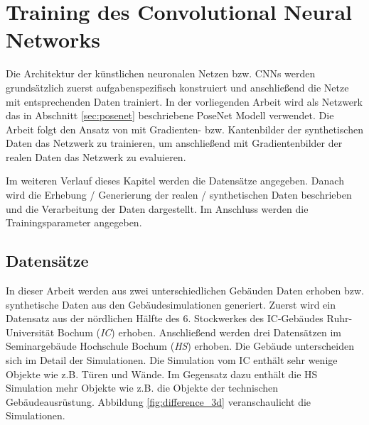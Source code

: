 
\section{Training des Convolutional Neural Networks}
Die Architektur der künstlichen neuronalen Netzen bzw. CNNs werden grundsätzlich zuerst aufgabenspezifisch konstruiert und anschließend die Netze mit entsprechenden Daten trainiert. In der vorliegenden Arbeit wird als Netzwerk das in Abschnitt \ref{sec:posenet} beschriebene PoseNet Modell verwendet. Die Arbeit folgt den Ansatz von \citet{acharyaBIMPoseNetIndoorCamera2019} mit Gradienten- bzw. Kantenbilder der synthetischen Daten das Netzwerk zu trainieren, um anschließend mit Gradientenbilder der realen Daten das Netzwerk zu evaluieren. 


Im weiteren Verlauf dieses Kapitel werden die Datensätze angegeben. Danach wird die Erhebung / Generierung der realen / synthetischen Daten beschrieben und die Verarbeitung der Daten dargestellt. Im Anschluss werden die Trainingsparameter angegeben. 

\subsection{Datensätze}
\label{subsec:datasets}
In dieser Arbeit werden aus zwei unterschiedlichen Gebäuden Daten erhoben bzw. synthetische Daten aus den Gebäudesimulationen generiert. 
Zuerst wird ein Datensatz aus der nördlichen Hälfte des 6. Stockwerkes des IC-Gebäudes Ruhr-Universität Bochum (\textit{IC}) erhoben. Anschließend werden drei Datensätzen im Seminargebäude Hochschule Bochum (\textit{HS}) erhoben. Die Gebäude unterscheiden sich im Detail der Simulationen. Die Simulation vom IC enthält sehr wenige Objekte wie z.B. Türen und Wände. Im Gegensatz dazu enthält die HS Simulation mehr Objekte wie z.B. die Objekte der technischen Gebäudeausrüstung. Abbildung \ref{fig:difference_3d} veranschaulicht die Simulationen.


